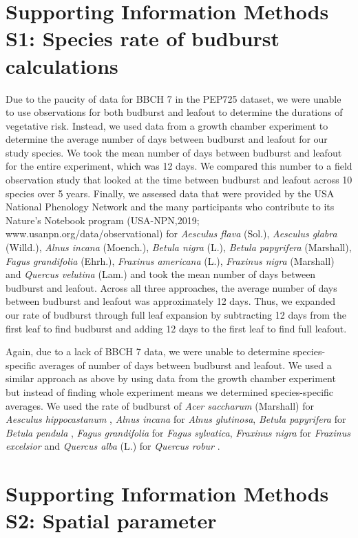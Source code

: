 \documentclass{article}\usepackage[]{graphicx}\usepackage[]{color}
\begin{document}
\section*{Supporting Information Methods S1: Species rate of budburst calculations}
Due to the paucity of data for BBCH 7 in the PEP725 dataset, we were unable to use observations for both budburst and leafout to determine the durations of vegetative risk. Instead, we used data from a growth chamber experiment \citep{Flynn2018} to determine the average number of days between budburst and leafout for our study species. We took the mean number of days between budburst and leafout for the entire experiment, which was 12 days. We compared this number to a field observation study \citep{Donnelly2017} that looked at the time between budburst and leafout across 10 species over 5 years. Finally, we assessed data that were provided by the USA National Phenology Network and the many participants who contribute to its Nature's Notebook program (USA-NPN,2019; www.usanpn.org/data/observational) for \textit{Aesculus flava} (Sol.), \textit{Aesculus glabra} (Willd.), \textit{Alnus incana} (Moench.), \textit{Betula nigra} (L.), \textit{Betula papyrifera} (Marshall), \textit{Fagus grandifolia} (Ehrh.), \textit{Fraxinus americana} (L.), \textit{Fraxinus nigra} (Marshall) and \textit{Quercus velutina} (Lam.) and took the mean number of days between budburst and leafout. Across all three approaches, the average number of days between budburst and leafout was approximately 12 days. Thus, we expanded our rate of budburst through full leaf expansion by subtracting 12 days from the first leaf to find budburst and adding 12 days to the first leaf to find full leafout. 

Again, due to a lack of BBCH 7 data, we were unable to determine species-specific averages of number of days between budburst and leafout. We used a similar approach as above by using data from the growth chamber experiment \citep{Flynn2018} but instead of finding whole experiment means we determined species-specific averages. We used the rate of budburst of \textit{Acer saccharum} (Marshall) for \textit{Aesculus hippocastanum} \citep{Buerki2010}, \textit{Alnus incana} for \textit{Alnus glutinosa}, \textit{Betula papyrifera} for \textit{Betula pendula} \citep{Wang2016}, \textit{Fagus grandifolia} for \textit{Fagus sylvatica}, \textit{Fraxinus nigra} for \textit{Fraxinus excelsior} and \textit{Quercus alba} (L.) for \textit{Quercus robur} \citep{Hipp2017}.

\section*{Supporting Information Methods S2: Spatial parameter} %
\end{document}
